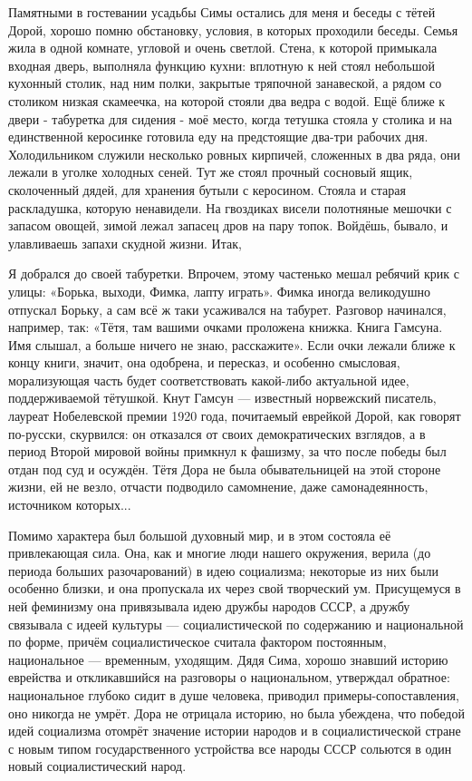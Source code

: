 \label{45-1}
Памятными в гостевании усадьбы Симы остались для меня и беседы с тётей Дорой, хорошо помню обстановку, условия, в которых проходили беседы. Семья жила в одной комнате, угловой и очень светлой. Стена, к которой примыкала входная дверь, выполняла функцию кухни: вплотную к ней стоял небольшой кухонный столик, над ним полки, закрытые тряпочной занавеской, а рядом со столиком низкая скамеечка, на которой стояли два ведра с водой. Ещё ближе к двери - табуретка для сидения - моё место, когда тетушка стояла у столика и на единственной керосинке готовила еду на предстоящие два-три рабочих дня. Холодильником служили несколько ровных кирпичей, сложенных в два ряда, они лежали в уголке холодных сеней. Тут же стоял прочный сосновый ящик, сколоченный дядей, для хранения бутыли с керосином. Стояла и старая раскладушка, которую ненавидели. На гвоздиках висели полотняные мешочки с запасом овощей, зимой лежал запасец дров на пару топок. Войдёшь, бывало, и улавливаешь запахи скудной жизни. Итак,

\label{46-1}
Я добрался до своей табуретки. Впрочем, этому частенько мешал ребячий крик с улицы: «Борька, выходи, Фимка, лапту играть». Фимка иногда великодушно отпускал Борьку, а сам всё ж таки усаживался на табурет. Разговор начинался, например, так: «Тётя, там вашими очками проложена книжка. Книга Гамсуна. Имя слышал, а больше ничего не знаю, расскажите». Если очки лежали ближе к концу книги, значит, она одобрена, и пересказ, и особенно смысловая, морализующая часть будет соответствовать какой-либо актуальной идее, поддерживаемой тётушкой. Кнут Гамсун — известный норвежский писатель, лауреат Нобелевской премии 1920 года, почитаемый еврейкой Дорой, как говорят по-русски, скурвился: он отказался от своих демократических взглядов, а в период Второй мировой войны примкнул к фашизму, за что после победы был отдан под суд и осуждён. Тётя Дора не была обывательницей на этой стороне жизни, ей не везло, отчасти подводило самомнение, даже самонадеянность, источником которых...

\label{47-1}
Помимо характера был большой духовный мир, и в этом состояла её привлекающая сила. Она, как и многие люди нашего окружения, верила (до периода больших разочарований) в идею социализма; некоторые из них были особенно близки, и она пропускала их через свой творческий ум. Присущемуся в ней феминизму она привязывала идею дружбы народов СССР, а дружбу связывала с идеей культуры — социалистической по содержанию и национальной по форме, причём социалистическое считала фактором постоянным, национальное — временным, уходящим. Дядя Сима, хорошо знавший историю еврейства и откликавшийся на разговоры о национальном, утверждал обратное: национальное глубоко сидит в душе человека, приводил примеры-сопоставления, оно никогда не умрёт. Дора не отрицала историю, но была убеждена, что победой идей социализма отомрёт значение истории народов и в социалистической стране с новым типом государственного устройства все народы СССР сольются в один новый социалистический народ.

